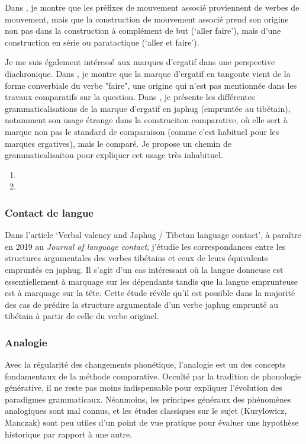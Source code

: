\documentclass[oldfontcommands,oneside,a4paper,11pt]{article}
\begin{document}
Dans \citet{jacques13harmonization}, je montre que les préfixes de mouvement associé proviennent de verbes de mouvement, mais que la construction de mouvement associé prend son origine non pas dans la construction à complément de but (`aller faire'), mais d'une construction en série ou paratactique (`aller et faire').

Je me suis également intéressé aux marques d'ergatif dans une perspective diachronique. Dans \citet{jacques14ergative}, je montre que la marque d'ergatif en tangoute vient de la forme converbiale du verbe "faire", une origine qui n'est pas mentionnée dans les travaux comparatifs sur la question. Dans \citet{jacques16comparative}, je présente les différentes grammaticalisations de la marque d'ergatif en japhug (empruntée au tibétain), notamment son usage étrange dans la construciton comparative, où elle sert à marque non pas le standard de comparaison (comme c'est habituel pour les marques ergatives), mais le comparé. Je propose un chemin de grammaticalisaiton pour expliquer cet usage très inhabituel.

\begin{enumerate}
 \item  {}
 \item {}
\end{enumerate}

\subsubsection{Contact de langue}
Dans l'article `Verbal valency and Japhug / Tibetan language contact', à paraître en 2019 au \textit{Journal of language contact}, j'étudie les correspondances entre les structures argumentales des verbes tibétains et ceux de leurs équivalents empruntés en japhug. Il s'agit d'un cas intéressant où la langue donneuse est essentiellement à marquage sur les dépendants tandis que la langue emprunteuse est à marquage sur la tête. Cette étude révèle qu'il est possible dans la majorité des cas de prédire la structure argumentale d'un verbe japhug emprunté au tibétain à partir de celle du verbe originel.

\subsubsection{Analogie}
Avec la régularité des changements phonétique, l'analogie est un des concepts fondamentaux de la méthode comparative. Occulté par la tradition de phonologie générative, il ne reste pas moins indispensable pour expliquer l'évolution des paradigmes grammaticaux. Néanmoins, les principes généraux des phénomènes analogiques sont mal connus, et les études classiques sur le sujet (Kurylowicz, Manczak) sont peu utiles d'un point de vue pratique pour évaluer une hypothèse historique par rapport à une autre. 
\end{document}

